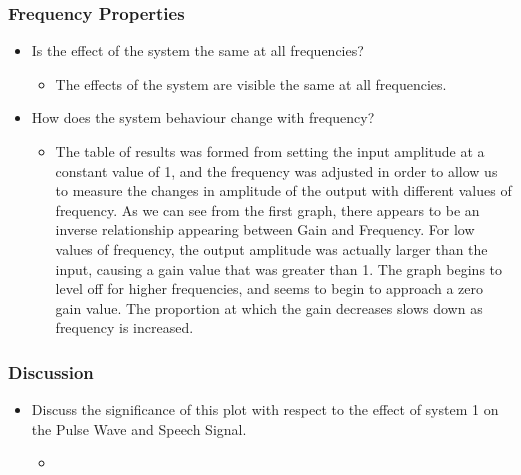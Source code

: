 \documentclass[12pt]{article}
\begin{document}
\subsubsection{Frequency Properties}
\begin{itemize}
\item Is the effect of the system the same at all frequencies?
\begin{itemize}
\item The effects of the system are visible the same at all frequencies.
\end{itemize}
\item How does the system behaviour change with frequency?
\begin{itemize}
\item The table of results was formed from setting the input amplitude at a constant value of 1, and the frequency was adjusted in order to allow us to measure the changes in amplitude of the output with different values of frequency. As we can see from the first graph, there appears to be an inverse relationship appearing between Gain and Frequency. For low values of frequency, the output amplitude was actually larger than the input, causing a gain value that was greater than 1. The graph begins to level off for higher frequencies, and seems to begin to approach a zero gain value. The proportion at which the gain decreases slows down as frequency is increased.
\end{itemize}
\end{itemize}
\subsubsection{Discussion}
\begin{itemize}
\item Discuss the significance of this plot with respect to the effect of system 1 on the Pulse Wave and Speech Signal.
\begin{itemize}
\item 
\end{itemize}
\end{itemize}
\end{document}
